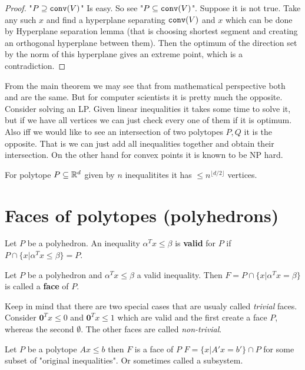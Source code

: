 \begin{proof}
	"$P \supseteq \mathtt{conv}(V)$" Is easy. So see "$P \subseteq \mathtt{conv}(V)$". Suppose it is not true. Take any such $x$ and find a hyperplane separating $\mathtt{conv}(V)$ and $x$ which can be done by Hyperplane separation lemma (that is choosing shortest segment and creating an orthogonal hyperplane between them). Then the optimum of the direction set by the norm of this hyperplane gives an extreme point, which is a contradiction.
\end{proof}

From the main theorem we may see that from mathematical perspective both  and  are the same. But for computer scientists it is pretty much the opposite. Consider solving an LP. Given linear inequalities it takes some time to solve it, but if we have all vertices we can just check every one of them if it is optimum. Also iff we would like to see an intersection of two polytopes $P,Q$ it is the opposite. That is we can just add all inequalities together and obtain their intersection. On the other hand for convex points it is known to be NP hard.

\begin{fact}
	For polytope $P \subseteq \mathbb{R}^{d}$ given by $n$ inequalitites it has $\leq n^{\lfloor d/2 \rfloor}$ vertices.
\end{fact}

\section{Faces of polytopes (polyhedrons)}

\begin{defn}
	Let $P$ be a polyhedron. An inequality $\alpha^{T} x \leq \beta$ is \textbf{valid} for $P$ if $P \cap \{x | \alpha^{T} x \leq \beta\} = P$.
\end{defn}

\begin{defn}
	Let $P$ be a polyhedron and $\alpha^{T} x \leq \beta$ a valid inequality. Then $F = P \cap \{x | \alpha^{T} x = \beta\}$ is called a \textbf{face} of $P$.
\end{defn}

Keep in mind that there are two special cases that are usualy called \textit{trivial} faces. Consider $\bm{0}^{T} x \leq 0$ and $\bm{0}^{T} x \leq 1$ which are valid and the first create a face $P$, whereas the second $\emptyset$. The other faces are called \textit{non-trivial}.

\begin{thm}
	Let $P$ be a polytope $A x \leq b$ then $F$ is a face of $P$ \ifft $F = \{x | A' x = b'\} \cap P$ for some subset of "original inequalities". Or sometimes called a subsystem.
\end{thm}

